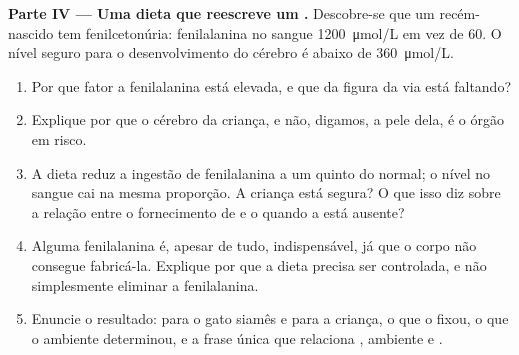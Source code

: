 \begin{problem}
\medskip
\noindent\textbf{Parte IV --- Uma dieta que reescreve um .}
Descobre-se que um recém-nascido tem fenilcetonúria: fenilalanina no
sangue \qty{1200}{\micro mol/L} em vez de \num{60}. O nível seguro para
o desenvolvimento do cérebro é abaixo de \qty{360}{\micro mol/L}.
\begin{enumerate}[resume]
  \item Por que fator a fenilalanina está elevada, e que  da
        figura da via está faltando?
  \item Explique por que o cérebro da criança, e não, digamos, a pele
        dela, é o órgão em risco.
  \item A dieta reduz a ingestão de fenilalanina a um quinto do
        normal; o nível no sangue cai na mesma proporção. A criança
        está segura? O que isso diz sobre a relação entre o
        fornecimento de  e o  quando a  está
        ausente?
  \item Alguma fenilalanina é, apesar de tudo, indispensável, já que o
        corpo não consegue fabricá-la. Explique por que a dieta precisa
        ser controlada, e não simplesmente eliminar a fenilalanina.
  \item Enuncie o resultado: para o gato siamês e para a criança, o que
        o  fixou, o que o ambiente determinou, e a frase única
        que relaciona , ambiente e .
\end{enumerate}
\end{problem}
